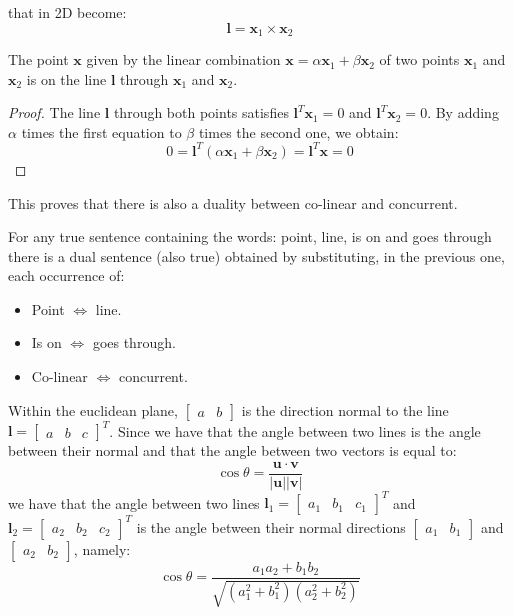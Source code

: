 \documentclass[12pt, a4paper]{report}
\begin{document}
    that in 2D become: 
    \[\boldsymbol{l}=\boldsymbol{x}_1 \times \boldsymbol {x}_2\] 
    \begin{example}[Property]
        The point $\boldsymbol{x}$ given by the linear combination $\boldsymbol{x}=\alpha\boldsymbol{x}_1+\beta\boldsymbol{x}_2$ of two points $\boldsymbol{x}_1$ and $\boldsymbol{x}_2$ is on the 
        line $\boldsymbol{l}$ through $\boldsymbol{x}_1$ and $\boldsymbol{x}_2$. 
    \end{example}
    \begin{proof}
        The line $\boldsymbol{l}$ through both points satisfies $\boldsymbol{l}^T\boldsymbol{x}_1=0$ and  $\boldsymbol{l}^T\boldsymbol{x}_2=0$. By adding $\alpha$ times the first 
        equation to $\beta$ times the second one, we obtain: 
        \[0=\boldsymbol{l}^T\left( \alpha\boldsymbol{x}_1+\beta\boldsymbol{x}_2 \right)=\boldsymbol{l}^T\boldsymbol{x}=0\]
    \end{proof}
    This proves that there is also a duality between co-linear and concurrent. 
    \begin{theorem}
        For any true sentence containing the words: point, line, is on and goes through there is a dual sentence (also true) obtained by substituting, in the previous one, each 
        occurrence of: 
        \begin{itemize}
            \item Point $\Leftrightarrow$ line. 
            \item Is on $\Leftrightarrow$ goes through.
            \item Co-linear $\Leftrightarrow$ concurrent. 
        \end{itemize}
    \end{theorem}
    Within the euclidean plane, $\begin{bmatrix} a & b \end{bmatrix}$ is the direction normal to the line $\boldsymbol{l}={\begin{bmatrix} a & b & c \end{bmatrix}}^T$. Since we have that
    the angle between two lines is the angle between their normal and that the angle between two vectors is equal to:
    \[\cos\theta=\dfrac{\boldsymbol{u} \cdot \boldsymbol{v}}{\left\lvert \boldsymbol{u} \right\rvert \left\lvert \boldsymbol{v} \right\rvert}\] 
    we have that the angle between two lines $\boldsymbol{l}_1={\begin{bmatrix} a_1 & b_1 & c_1 \end{bmatrix}}^T$ and $\boldsymbol{l}_2={\begin{bmatrix} a_2 & b_2 & c_2 \end{bmatrix}}^T$ 
    is the angle between their normal directions $\begin{bmatrix} a_1 & b_1 \end{bmatrix}$ and $\begin{bmatrix} a_2 & b_2 \end{bmatrix}$, namely: 
    \[\cos\theta=\dfrac{a_1a_2+b_1b_2}{\sqrt{\left( a_1^2 + b_1^2 \right)\left( a_2^2 + b_2^2 \right)}}\]
    
\end{document}
